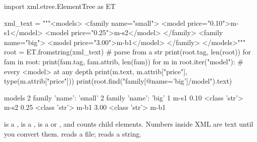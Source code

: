 \begin{center}
\end{center}

\begin{pycode}
import xml.etree.ElementTree as ET

xml_text = """<models>
  <family name="small">
    <model price="0.10">m-s1</model>
    <model price="0.25">m-s2</model>
  </family>
  <family name="big">
    <model price="3.00">m-b1</model>
  </family>
</models>"""
root = ET.fromstring(xml_text)          # parse from a str
print(root.tag, len(root))
for fam in root:
    print(fam.tag, fam.attrib, len(fam))
for m in root.iter("model"):             # every <model> at any depth
    print(m.text, m.attrib["price"], type(m.attrib["price"]))
print(root.find("family[@name='big']/model").text)
\end{pycode}
\begin{rawcode}
models 2
family {'name': 'small'} 2
family {'name': 'big'} 1
m-s1 0.10 <class 'str'>
m-s2 0.25 <class 'str'>
m-b1 3.00 <class 'str'>
m-b1
\end{rawcode}

\begin{typecheck}
 is a ,  is a ,  is a
 or , and  counts child elements. Numbers inside XML
are text until you convert them.  reads a file; 
reads a string.
\end{typecheck}

